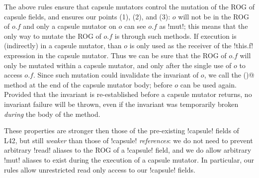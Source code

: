 	
\noindent The above rules ensure that capsule mutators control the mutation of the ROG of capsule fields, and 
 ensures our points (1), (2), and (3):
$o$ will not be in the ROG of $o.f$ and
only a capsule mutator on $o$ can see $o.f$ as \Q!mut!; this means that the only way to mutate the ROG of $o.f$ is through such methods. 
If execution is (indirectly) in a capsule mutator, than $o$ is only used as the receiver of the \Q!this.f! expression in the capsule mutator.
Thus we can be sure that the ROG of $o.f$ will only be mutated within a capsule mutator, and only after the single use of $o$ to access $o.f$.
Since such mutation could invalidate the invariant of $o$, we call the \Q@invariant()@ method at the end of the capsule mutator body; before $o$ can be used again. Provided that the invariant is re-established before a capsule mutator returns, no invariant failure will be thrown, even if the invariant was temporarily broken \emph{during} the body of the method.


These properties are stronger then those of the pre-existing \Q!capsule! fields of L42, but still
\emph{weaker} than those of \Q!capsule! \emph{references}: we do not need to prevent arbitrary \Q!read! aliases to the ROG of a \Q!capsule! field, and we do allow arbitrary \Q!mut! aliases  to exist during the execution of a capsule mutator. In particular, our rules allow unrestricted read only access to our \Q!capsule! fields.



